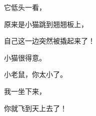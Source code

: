 \newpage
{} %
\vspace*{15pt}
{\linespread{1.5}\fontsize{18}{18}\selectfont
它低头一看，\par
原来是小猫跳到翘翘板上，\par
自己这一边突然被撬起来了！\par
小猫很得意。\par
小老鼠，你太小了。\par
我一坐下来，\par
你就飞到天上去了！\par
\par
\par}
\ClearShipoutPicture

